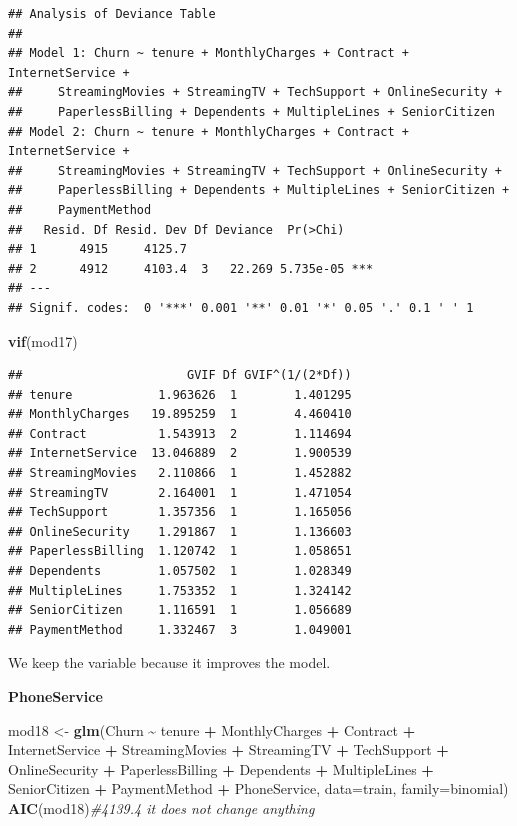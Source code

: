\documentclass[
  twoside]{article}
\newenvironment{Shaded}{\begin{snugshade}}{\end{snugshade}}
\newcommand{\AttributeTok}[1]{\textcolor[rgb]{0.13,0.29,0.53}{#1}}
\newcommand{\CommentTok}[1]{\textcolor[rgb]{0.56,0.35,0.01}{\textit{#1}}}
\newcommand{\FunctionTok}[1]{\textcolor[rgb]{0.13,0.29,0.53}{\textbf{#1}}}
\newcommand{\NormalTok}[1]{#1}
\newcommand{\OtherTok}[1]{\textcolor[rgb]{0.56,0.35,0.01}{#1}}
\newcommand{\SpecialCharTok}[1]{\textcolor[rgb]{0.81,0.36,0.00}{\textbf{#1}}}
\begin{document}
\begin{verbatim}
## Analysis of Deviance Table
## 
## Model 1: Churn ~ tenure + MonthlyCharges + Contract + InternetService + 
##     StreamingMovies + StreamingTV + TechSupport + OnlineSecurity + 
##     PaperlessBilling + Dependents + MultipleLines + SeniorCitizen
## Model 2: Churn ~ tenure + MonthlyCharges + Contract + InternetService + 
##     StreamingMovies + StreamingTV + TechSupport + OnlineSecurity + 
##     PaperlessBilling + Dependents + MultipleLines + SeniorCitizen + 
##     PaymentMethod
##   Resid. Df Resid. Dev Df Deviance  Pr(>Chi)    
## 1      4915     4125.7                          
## 2      4912     4103.4  3   22.269 5.735e-05 ***
## ---
## Signif. codes:  0 '***' 0.001 '**' 0.01 '*' 0.05 '.' 0.1 ' ' 1
\end{verbatim}

\begin{Shaded}
\begin{Highlighting}[]
\FunctionTok{vif}\NormalTok{(mod17)}
\end{Highlighting}
\end{Shaded}

\begin{verbatim}
##                       GVIF Df GVIF^(1/(2*Df))
## tenure            1.963626  1        1.401295
## MonthlyCharges   19.895259  1        4.460410
## Contract          1.543913  2        1.114694
## InternetService  13.046889  2        1.900539
## StreamingMovies   2.110866  1        1.452882
## StreamingTV       2.164001  1        1.471054
## TechSupport       1.357356  1        1.165056
## OnlineSecurity    1.291867  1        1.136603
## PaperlessBilling  1.120742  1        1.058651
## Dependents        1.057502  1        1.028349
## MultipleLines     1.753352  1        1.324142
## SeniorCitizen     1.116591  1        1.056689
## PaymentMethod     1.332467  3        1.049001
\end{verbatim}

We keep the variable because it improves the model.

\textbf{PhoneService}

\begin{Shaded}
\begin{Highlighting}[]
\NormalTok{mod18 }\OtherTok{\textless{}{-}} \FunctionTok{glm}\NormalTok{(Churn }\SpecialCharTok{\textasciitilde{}}\NormalTok{ tenure }\SpecialCharTok{+}\NormalTok{ MonthlyCharges }\SpecialCharTok{+}\NormalTok{ Contract }\SpecialCharTok{+}\NormalTok{ InternetService }\SpecialCharTok{+} 
\NormalTok{               StreamingMovies }\SpecialCharTok{+}\NormalTok{ StreamingTV }\SpecialCharTok{+}\NormalTok{ TechSupport }\SpecialCharTok{+}\NormalTok{ OnlineSecurity }\SpecialCharTok{+} 
\NormalTok{               PaperlessBilling }\SpecialCharTok{+}\NormalTok{ Dependents }\SpecialCharTok{+}\NormalTok{ MultipleLines }\SpecialCharTok{+}\NormalTok{ SeniorCitizen }\SpecialCharTok{+} 
\NormalTok{               PaymentMethod }\SpecialCharTok{+}\NormalTok{ PhoneService, }\AttributeTok{data=}\NormalTok{train, }\AttributeTok{family=}\NormalTok{binomial)}
\FunctionTok{AIC}\NormalTok{(mod18)}\CommentTok{\#4139.4 it does not change anything}
\end{Highlighting}
\end{Shaded}
\end{document}
